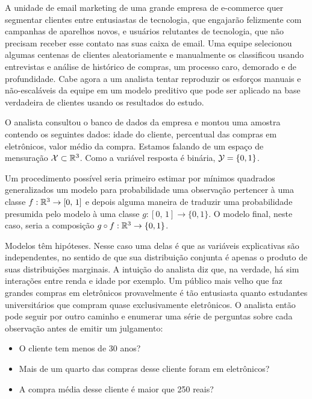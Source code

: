 \begin{exemplo}
 A unidade de email marketing de uma grande empresa de e-commerce quer segmentar clientes entre entusiastas de tecnologia, que engajarão felizmente com campanhas de aparelhos novos, e usuários relutantes de tecnologia, que não precisam receber esse contato nas suas caixa de email. Uma equipe selecionou algumas centenas de clientes aleatoriamente e manualmente os classificou usando entrevistas e análise de histórico de compras, um processo caro, demorado e de profundidade. Cabe agora a um analista tentar reproduzir os esforços manuais e não-escaláveis da equipe em um modelo preditivo que pode ser aplicado na base verdadeira de clientes usando os resultados do estudo.

O analista consultou o banco de dados da empresa e montou uma amostra contendo os seguintes dados: idade do cliente, percentual das compras em eletrônicos, valor médio da compra. Estamos falando de um espaço de mensuração $\mathcal{X} \subset \mathbb{R}^3$. Como a variável resposta é binária, $\mathcal{Y} = \{0, 1\}$. 

Um procedimento possível seria primeiro estimar por mínimos quadrados generalizados um modelo para probabilidade uma observação pertencer à uma classe $f: \mathbb{R}^3 \to [0, \, 1]$ e depois alguma maneira de traduzir uma probabilidade presumida pelo modelo à uma classe $g: [0, \, 1] \to \{0, 1\}$. O modelo final, neste caso, seria a composição $g \circ f: \mathbb{R}^3 \to \{0, 1\} $.

Modelos têm hipóteses. Nesse caso uma delas é que as variáveis explicativas são independentes, no sentido de que sua distribuição conjunta é apenas o produto de suas distribuições marginais. A intuição do analista diz que, na verdade, há sim interações entre renda e idade por exemplo. Um público mais velho que faz grandes compras em eletrônicos provavelmente é tão entusiasta quanto estudantes universitários que compram quase exclusivamente eletrônicos. O analista então pode seguir por outro caminho e enumerar uma série de perguntas sobre cada observação antes de emitir um julgamento:

\begin{itemize}
    \item O cliente tem menos de 30 anos?
    \item Mais de um quarto das compras desse cliente foram em eletrônicos?
    \item A compra média desse cliente é maior que 250 reais?
\end{itemize}


\end{exemplo}
